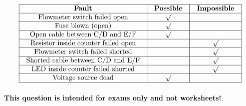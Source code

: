 






$$\vbox{\offinterlineskip
\halign{\strut
\vrule \quad\hfil # \ \hfil & 
\vrule \quad\hfil # \ \hfil & 
\vrule \quad\hfil # \ \hfil \vrule \cr
\noalign{\hrule}
%
{\bf Fault} & {\bf Possible} & {\bf Impossible} \cr
%
\noalign{\hrule}
%
Flowmeter switch failed open & $\surd$ &  \cr
%
\noalign{\hrule}
%
Fuse blown (open) & $\surd$ &  \cr
%
\noalign{\hrule}
%
Open cable between C/D and E/F & $\surd$ &  \cr
%
\noalign{\hrule}
%
Resistor inside counter failed open &  & $\surd$ \cr
%
\noalign{\hrule}
%
Flowmeter switch failed shorted &  & $\surd$ \cr
%
\noalign{\hrule}
%
Shorted cable between C/D and E/F &  & $\surd$ \cr
%
\noalign{\hrule}
%
LED inside counter failed shorted &  & $\surd$ \cr
%
\noalign{\hrule}
%
Voltage source dead & $\surd$ &  \cr
%
\noalign{\hrule}
} %
}$$ %








{\bf This question is intended for exams only and not worksheets!}.


